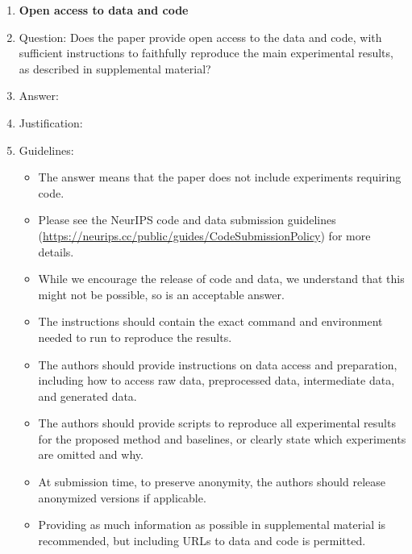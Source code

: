 \begin{enumerate}
\item {\bf Open access to data and code}
    \item[] Question: Does the paper provide open access to the data and code, with sufficient instructions to faithfully reproduce the main experimental results, as described in supplemental material?
    \item[] Answer: \answerTODO{}
    \item[] Justification: \justificationTODO{}
    \item[] Guidelines:
    \begin{itemize}
        \item The answer \answerNA{} means that the paper does not include experiments requiring code.
        \item Please see the NeurIPS code and data submission guidelines (\url{https://neurips.cc/public/guides/CodeSubmissionPolicy}) for more details.
        \item While we encourage the release of code and data, we understand that this might not be possible, so \answerNo{} is an acceptable answer.
        \item The instructions should contain the exact command and environment needed to run to reproduce the results.
        \item The authors should provide instructions on data access and preparation, including how to access raw data, preprocessed data, intermediate data, and generated data.
        \item The authors should provide scripts to reproduce all experimental results for the proposed method and baselines, or clearly state which experiments are omitted and why.
        \item At submission time, to preserve anonymity, the authors should release anonymized versions if applicable.
        \item Providing as much information as possible in supplemental material is recommended, but including URLs to data and code is permitted.
    \end{itemize}


\end{enumerate}
